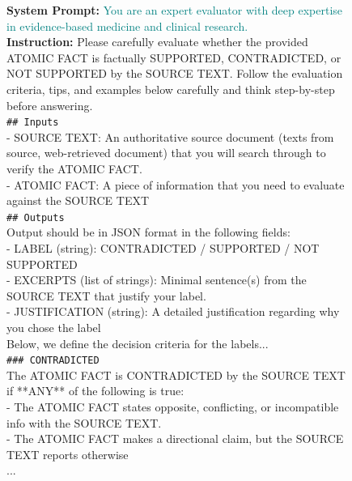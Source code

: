 \documentclass{article}
\begin{document}
\clearpage

\begin{figure}[t]
\begin{small}
\centering
\begin{tcolorbox}[
    colback=gray!5,
    colframe=black,
    width=\linewidth,
    arc=2mm,
    boxrule=0.5pt,
    title=\textbf{LLM Judge Prompt for Factual Precision Evaluation}
]
\textbf{System Prompt:} \textcolor{teal}{You are an expert evaluator with deep expertise in evidence-based medicine and clinical research.}\\

\textbf{Instruction:} Please carefully evaluate whether the provided ATOMIC FACT is factually SUPPORTED, CONTRADICTED, or NOT SUPPORTED by the SOURCE TEXT. Follow the evaluation criteria, tips, and examples below carefully and think step-by-step before answering.\\


\texttt{\#\# Inputs}\\
- SOURCE TEXT: An authoritative source document (texts from source, web-retrieved document) that you will search through to verify the ATOMIC FACT. \\
- ATOMIC FACT: A piece of information that you need to evaluate against the SOURCE TEXT\\

\texttt{\#\# Outputs}\\
Output should be in JSON format in the following fields:\\
- LABEL (string): CONTRADICTED / SUPPORTED / NOT SUPPORTED \\
- EXCERPTS (list of strings): Minimal sentence(s) from the SOURCE TEXT that justify your label. \\
- JUSTIFICATION (string): A detailed justification regarding why you chose the label \\

Below, we define the decision criteria for the labels...\\

\texttt{\#\#\# CONTRADICTED} \\
The ATOMIC FACT is CONTRADICTED by the SOURCE TEXT if **ANY** of the following is true:\\
- The ATOMIC FACT states opposite, conflicting, or incompatible info with the SOURCE TEXT.\\
- The ATOMIC FACT makes a directional claim, but the SOURCE TEXT reports otherwise\\ 
...\\


\end{tcolorbox}
\end{small}
\end{figure}
\end{document}
